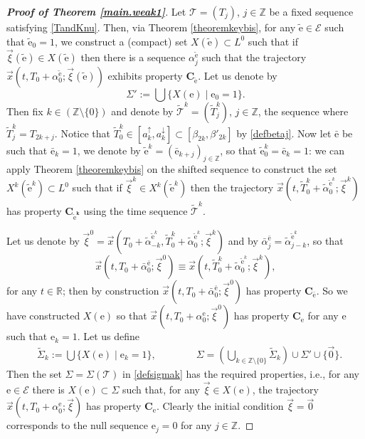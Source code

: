 \documentclass[10pt]{article}
\numberwithin{equation}{section}
\def\Z{{\mathbb Z}}
\def\R{{\mathbb R}}
\def\ee{{\mathrm e}}
\def\EE{{\mathcal E}}
\def\TT{{\mathcal T}}
\def\aup{a^{\uparrow}}
\def\adown{a^{\downarrow}}
\def\xxi{\vec{\xi}}
\def\x{\vec{x}}
\newcommand\bs[1]{{\boldsymbol{#1}}}
\theoremstyle{definition}
\theoremstyle{remark}
\begin{document}
\begin{proof}[\textbf{Proof of Theorem \ref{main.weak1}}]
Let $\TT=(T_j)$, $j \in \Z$ be a fixed sequence satisfying \eqref{TandKnu}.
Then, via Theorem
  \ref{theoremkeybis}, for any  $\tilde{\ee} \in \EE$ such that $\tilde{\ee}_0=1$,
  we construct a (compact) set $X(\tilde{\ee})\subset L^0$ such that if $\xxi(\tilde{\ee}) \in X(\tilde{\ee})$
  then there is a sequence $\alpha_j^{\tilde{\ee}}$ such that the trajectory $\x(t, T_0+\alpha_0^{\tilde{\ee}}; \xxi(\tilde{\ee}))$
  exhibits property
  $\bs{C_{\tilde{\ee}}}$.
  Let us denote by
  \begin{equation}\label{defsigma0}
    \Sigma':= \bigcup \{   X(\ee) \mid \ee_0=1 \}.
  \end{equation}
Then fix $k \in (\Z \setminus \{0 \})$ and denote by $\tilde{\TT}^k= (\tilde{T}^k_j)$, $j \in \Z$, the sequence where
$\tilde{T}^k_j= T_{2k+j}$.
Notice that $\tilde{T}_0^k \in [ \aup_{k} ,  \adown_{k} ] \subset [\beta_{2k}, \beta'_{2k}]$ by
\eqref{defbetaj}. Now let $\bar{\ee}$ be
such that $\bar{\ee}_k=1$, we
denote by
$\tilde{\ee}^k=(\bar{\ee}_{k+j})_{j \in \Z}$, so that $\tilde{\ee}^k_0=\bar{\ee}_k=1$: we can apply Theorem
   \ref{theoremkeybis}  on the shifted sequence to construct the set $X^k( \tilde{\ee}^k)\subset L^0$ such that if
  $\xxi^k \in X^k( \tilde{\ee}^k)$ then the trajectory $\x(t, \tilde{T}^k_0+\tilde{\alpha}_0^{\tilde{\ee}^k}; \xxi^k)$
  has property   $\bs{C_{\tilde{\ee}^{\boldsymbol{k}}}}$  using the time sequence $\tilde{\TT}^k$.

  Let us denote by   $\xxi^0=\x(T_0+\tilde{\alpha}_{-k}^{\tilde{\ee}^k}, \tilde{T}^k_0+\tilde{\alpha}_0^{\tilde{\ee}^k}; \xxi^k)$
   and by
  $\bar{\alpha}_j^{\bar{\ee}}=\tilde{\alpha}_{j-k}^{\tilde{\ee}^k}$, so that
  $$\x(t,T_0+\bar{\alpha}_{0}^{\bar{\ee}} ; \xxi^0) \equiv  \x(t, \tilde{T}^k_0+\tilde{\alpha}_0^{\tilde{\ee}^k}; \xxi^k),$$
  for any $t \in \R$;
  then by construction $\x(t,T_0+\bar{\alpha}_{0}^{\bar{\ee}}; \xxi^0)$ has property $\bs{C_{\bar{\ee}}}$. So we have  constructed $X(\ee)$
    so that $\x(t,T_0+\alpha_{0}^{\ee}; \xxi^0)$ has property $\bs{C_{\ee}}$ for any $\ee$ such that $\ee_k=1$.
  Let us  define
     \begin{equation}\label{defsigmak}
  \begin{split}
       & \tilde{\Sigma}_k:= \bigcup \{   X(\ee) \mid \ee_{k}=1 \},
       \qquad \qquad \Sigma = (\bigcup_{k \in \Z \setminus \{ 0\}  } \tilde{\Sigma}_{k} ) \cup \Sigma' \cup \{\vec{0} \}.
  \end{split}
  \end{equation}
     Then the set $\Sigma=\Sigma (\TT)$ in \eqref{defsigmak} has the required properties, i.e., for any $\ee \in \EE$ there is
  $X(\ee) \subset \Sigma$ such that, for any $\xxi \in X(\ee)$, the   trajectory $\x(t,T_0+\alpha_{0}^{\ee}; \xxi)$ has property
  $\bs{C_{\ee}}$. Clearly the
  initial condition $\xxi=\vec{0}$
  corresponds to the null sequence $\ee_j=0$ for any $j \in \Z$.
\end{proof}
\end{document}
